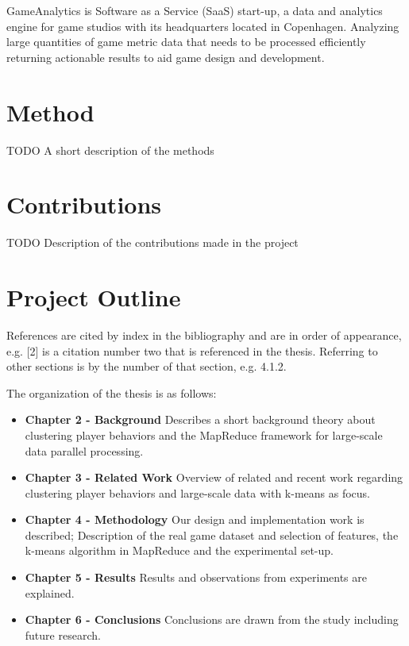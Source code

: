 GameAnalytics is Software as a Service (SaaS) start-up, a data and analytics engine for game studios with its headquarters located in Copenhagen. Analyzing large quantities of game metric data that needs to be processed efficiently returning actionable results to aid game design and development. 

\section{Method}
TODO
A short description of the methods

\lipsum[2]

\section{Contributions}
TODO
Description of the contributions made in the project

\lipsum[3]


\section{Project Outline}
References are cited by index in the bibliography and are in order of appearance, e.g. [2] is a citation number two that is referenced in the thesis. Referring to other sections is by the number of that section, e.g. 4.1.2.

The organization of the thesis is as follows: 
\begin{itemize}
\item \textbf{Chapter 2 - Background} Describes a short background theory about clustering player behaviors and the MapReduce framework for large-scale data parallel processing.
\item \textbf{Chapter 3 - Related Work} Overview of related and recent work regarding clustering player behaviors and large-scale data with k-means as focus.
\item \textbf{Chapter 4 - Methodology} Our design and implementation work is described; Description of the real game dataset and selection of features, the k-means algorithm in MapReduce and the experimental set-up.
\item \textbf{Chapter 5 - Results} Results and observations from experiments are explained.
\item \textbf{Chapter 6 - Conclusions} Conclusions are drawn from the study including future research.
\end{itemize}
